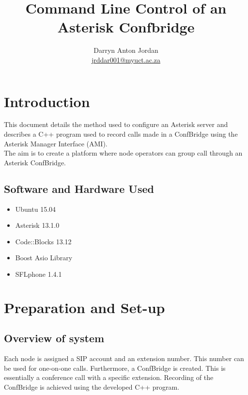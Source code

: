 \documentclass[a4paper,11pt]{report}
\title{Command Line Control of an Asterisk Confbridge}
\author{Darryn Anton Jordan \\\href{mailto:jrddar001@myuct.ac.za}{jrddar001@myuct.ac.za}}
\begin{document}
\maketitle
\tableofcontents


\newpage

\section{Introduction}
This document details the method used to configure an Asterisk server and describes a C++ program used to record calls made in a ConfBridge using the Asterisk Manager Interface (AMI).\\ The aim is to create a platform where node operators can group call through an Asterisk ConfBridge. 

\subsection{Software and Hardware Used}
\begin{itemize}
  \item Ubuntu 15.04
  \item Asterisk 13.1.0
  \item Code::Blocks 13.12
  \item Boost Asio Library
  \item SFLphone 1.4.1
\end{itemize}

\newpage

\section{Preparation and Set-up}
\subsection{Overview of system}
Each node is assigned a SIP account and an extension number. This number can be used for one-on-one calls. Furthermore, a ConfBridge is created. This is essentially a conference call with a specific extension. Recording of the ConfBridge is achieved using the developed C++ program. 
\end{document}
